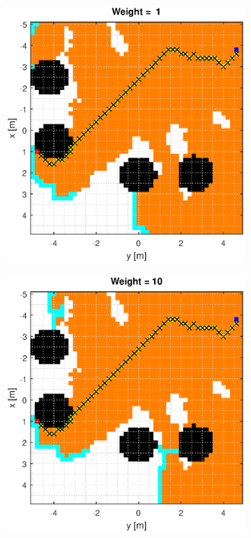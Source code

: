 \documentclass[Space3_Assign3.tex]{subfile}
\begin{document}
\begin{figure}
\centering
\caption{A* Manhattan Distance}
\label{Fig:A*eu}
\begin{subfigure}{0.49\linewidth}
\includegraphics[width = 1\linewidth]{Astar_man_1.eps}
\end{subfigure}
\begin{subfigure}{0.49\linewidth}
\includegraphics[width = 1\linewidth]{Astar_man_10.eps}

\end{subfigure}
\end{figure}
\end{document}
